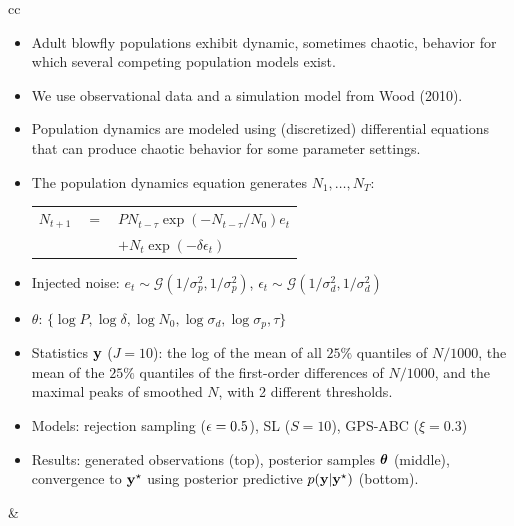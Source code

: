 \documentclass[portrait,a0b,final,a4resizeable]{include/a0poster}
\begin{document}
\begin{poster}
\begin{multicols}{3}
\begin{tabular}{cc}
\begin{minipage}[c]{0.47\columnwidth}
  \begin{itemize}
    \item Adult blowfly populations exhibit dynamic, sometimes chaotic, behavior for which several competing population models exist.  
    \item We use observational data and a simulation model from Wood (2010).
    \item Population dynamics are modeled using (discretized) differential equations that can produce chaotic behavior for some parameter settings.
    \item The population dynamics equation generates  $N_1, \ldots, N_T$:
    \begin{tabular}{rcl}
    	$N_{t+1}$    & $=$ & $P N_{t-\tau} \exp(-N_{t-\tau}/N_0) e_t$ \\
    	 &  & $ + N_t \exp(-\delta \epsilon_t)$
    \end{tabular}
    \item Injected noise: $e_t \sim  \mathcal{G}( 1/{\sigma_p^2},1/{\sigma_p^2})$,  $\epsilon_t  \sim  \mathcal{G}(1/{\sigma_d^2},1/{\sigma_d^2})$ 
    \item $\theta$: $\{ \log P, \log \delta, \log N_0, \log \sigma_d, \log \sigma_p, \tau\}$
    \item Statistics ${\bf y}$ ($J=10$): the log of the mean of all $25\%$ quantiles of $N/1000$, the mean of the $25\%$ quantiles of the first-order differences of $N/1000$, and the maximal peaks of smoothed $N$, with 2 different thresholds.
    \item Models: rejection sampling ($\epsilon=0.5$), SL ($S=10$), GPS-ABC ($\xi=0.3$) 
    \item Results: generated observations (top), posterior samples ${\bm \theta}$ (middle), convergence to ${\bf y}^{\star}$ using posterior predictive $p({\bf y} | {\bf y}^{\star} )$ (bottom).
  \end{itemize}
\end{minipage}
&
\begin{minipage}[c]{0.47\columnwidth}
  \begin{centering}
  \begin{tabular}{c}

\end{tabular}
\end{centering}
\end{minipage}
\end{tabular}
\end{multicols}
\end{poster}
\end{document}
